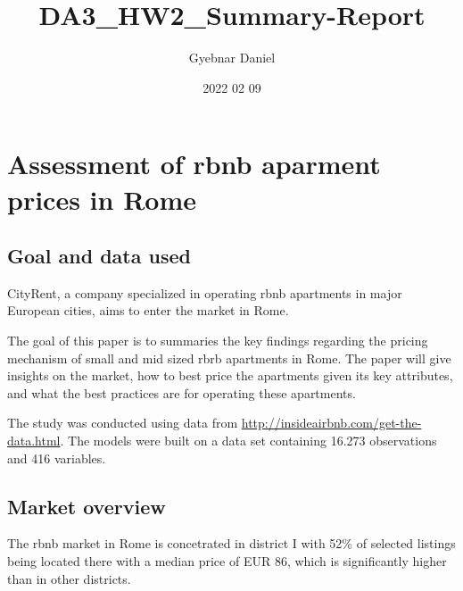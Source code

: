\documentclass[
]{article}
\title{DA3\_HW2\_Summary-Report}
\author{Gyebnar Daniel}
\date{2022 02 09}
\begin{document}
\maketitle

\hypertarget{assessment-of-rbnb-aparment-prices-in-rome}{%
\section{Assessment of rbnb aparment prices in
Rome}\label{assessment-of-rbnb-aparment-prices-in-rome}}

\hypertarget{goal-and-data-used}{%
\subsection{Goal and data used}\label{goal-and-data-used}}

CityRent, a company specialized in operating rbnb apartments in major
European cities, aims to enter the market in Rome.

The goal of this paper is to summaries the key findings regarding the
pricing mechanism of small and mid sized rbrb apartments in Rome. The
paper will give insights on the market, how to best price the apartments
given its key attributes, and what the best practices are for operating
these apartments.

The study was conducted using data from
\url{http://insideairbnb.com/get-the-data.html}. The models were built
on a data set containing 16.273 observations and 416 variables.

\hypertarget{market-overview}{%
\subsection{Market overview}\label{market-overview}}

The rbnb market in Rome is concetrated in district I with 52\% of
selected listings being located there with a median price of EUR 86,
which is significantly higher than in other districts.
\end{document}
